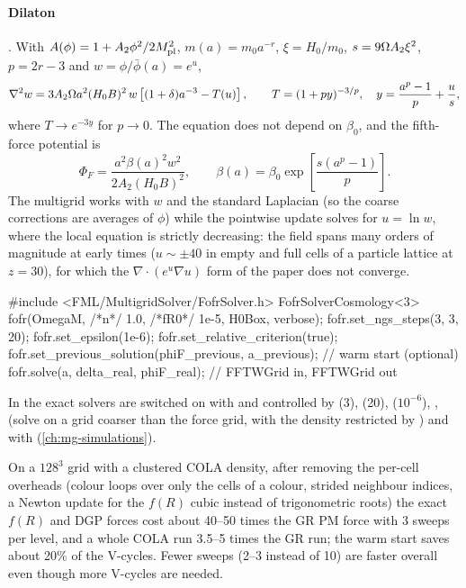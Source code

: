 \paragraph*{Dilaton} \cite{Brax2012}. With $A(\phi)=1+A_2\phi^2/2M_{\rm pl}^2$, $m(a)=m_0a^{-r}$, $\xi=H_0/m_0$,
$s=9\Omega A_2\xi^2$, $p=2r-3$ and $w=\phi/\bar\phi(a)=e^u$,
\begin{equation}
\nabla^2w=3A_2\Omega a^2(H_0B)^2\,w\left[(1+\delta)a^{-3}-T(u)\right],\qquad T=(1+py)^{-3/p},\quad y=\frac{a^p-1}{p}+\frac us,
\end{equation}
where $T\to e^{-3y}$ for $p\to0$. The equation does not depend on $\beta_0$, and the fifth-force potential is
\begin{equation}
\Phi_F=\frac{a^2\beta(a)^2w^2}{2A_2(H_0B)^2},\qquad\beta(a)=\beta_0\exp\left[\frac{s(a^p-1)}{p}\right].
\end{equation} The multigrid works with $w$ and the standard Laplacian (so the coarse corrections are
averages of $\phi$) while the pointwise update solves for $u=\ln w$, where the local equation is strictly decreasing: the field
spans many orders of magnitude at early times ($u\sim\pm40$ in empty and full cells of a particle lattice at $z=30$), for
which the $\nabla\cdot(e^u\nabla u)$ form of the paper does not converge.

\begin{cppcode}
#include <FML/MultigridSolver/FofrSolver.h>
FofrSolverCosmology<3> fofr(OmegaM, /*n*/ 1.0, /*fR0*/ 1e-5, H0Box, verbose);
fofr.set_ngs_steps(3, 3, 20);
fofr.set_epsilon(1e-6);
fofr.set_relative_criterion(true);
fofr.set_previous_solution(phiF_previous, a_previous);   // warm start (optional)
fofr.solve(a, delta_real, phiF_real);                     // FFTWGrid in, FFTWGrid out
\end{cppcode}

In  the exact solvers are switched on with  and controlled
by  (3),  (20), 
($10^{-6}$), ,  (solve on a grid coarser than the force
grid, with the density restricted by ) and  with
 (\cref{ch:mg-simulations}).

\begin{implementation}[Performance]
On a $128^3$ grid with a clustered COLA density, after removing the per-cell overheads (colour loops over only the cells of
a colour, strided neighbour indices, a Newton update for the $f(R)$ cubic instead of trigonometric roots) the exact $f(R)$ and
DGP forces cost about 40--50 times the GR PM force with 3 sweeps per level, and a whole COLA run 3.5--5 times the GR run; the
warm start saves about 20\% of the V-cycles. Fewer sweeps (2--3 instead of 10) are faster overall even though more V-cycles
are needed.
\end{implementation}

